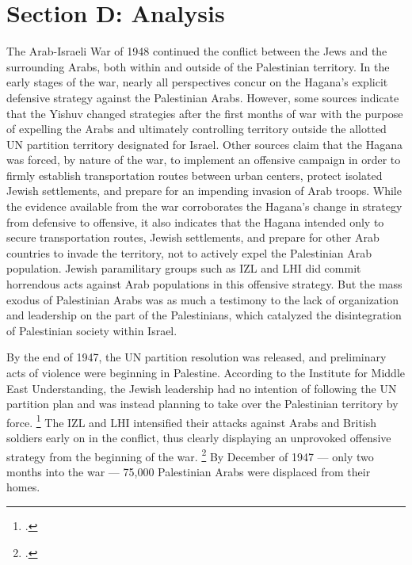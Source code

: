 \documentclass[12pt]{turabian-researchpaper}
\begin{document}

\section{Section D: Analysis}



The Arab-Israeli War of 1948 continued the conflict between the Jews and the surrounding Arabs, both within and outside of the Palestinian territory.  In the early stages of the war, nearly all perspectives concur on the Hagana's explicit defensive strategy against the Palestinian Arabs.
However, some sources indicate that the Yishuv changed strategies after the first months of war with the purpose of expelling the Arabs and ultimately controlling territory outside the allotted UN partition territory designated for Israel.  Other sources claim that the Hagana was forced, by nature of the war, to implement an offensive campaign in order to firmly establish transportation routes between urban centers, protect isolated Jewish settlements, and prepare for an impending invasion of Arab troops.
While the evidence available from the war corroborates the Hagana's change in strategy from defensive to offensive, it also indicates that the Hagana intended only to secure transportation routes, Jewish settlements, and prepare for other Arab countries to invade the territory, not to actively expel the Palestinian Arab population.  Jewish paramilitary groups such as IZL and LHI did commit horrendous acts against Arab populations in this offensive strategy.  But the mass exodus of Palestinian Arabs was as much a testimony to the lack of organization and leadership on the part of the Palestinians, which catalyzed the disintegration of Palestinian society within Israel.



By the end of 1947, the UN partition resolution was released, and preliminary acts of violence were beginning in Palestine.  According to the Institute for Middle East Understanding, the Jewish leadership had no intention of following the UN partition plan and was instead planning to take over the Palestinian territory by force.
\footcite{nabka}
The IZL and LHI intensified their attacks against Arabs and British soldiers early on in the conflict, thus clearly displaying an unprovoked offensive strategy from the beginning of the war.
\footcite{nabka}
By December of 1947 --- only two months into the war --- 75,000 Palestinian Arabs were displaced from their homes.
\end{document}
